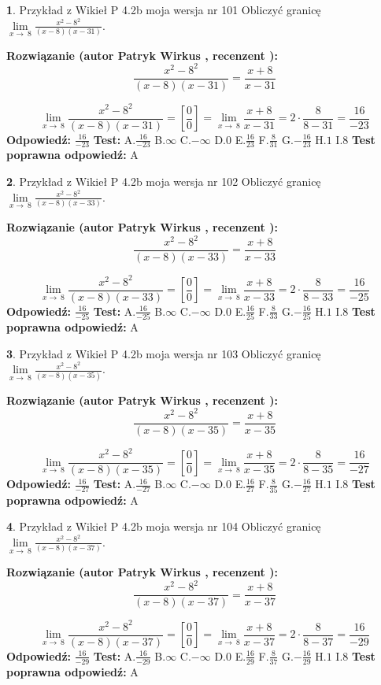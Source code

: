 \documentclass[12pt, a4paper]{article}
\theoremstyle{definition} %
\newtheorem{zad}{}
\newcommand{\zadStart}[1]{\begin{zad}#1\newline}
\newcommand{\zadStop}{\end{zad}}
\newcommand{\rozwStart}[2]{\noindent \textbf{Rozwiązanie (autor #1 , recenzent #2): }\newline}
\newcommand{\rozwStop}{\newline}
\newcommand{\odpStart}{\noindent \textbf{Odpowiedź:}\newline}
\newcommand{\odpStop}{\newline}
\newcommand{\testStart}{\noindent \textbf{Test:}\newline}
\newcommand{\testStop}{\newline}
\newcommand{\kluczStart}{\noindent \textbf{Test poprawna odpowiedź:}\newline}
\newcommand{\kluczStop}{\newline}
\begin{document}
\zadStart{Przykład z Wikieł P 4.2b moja wersja nr 101}
Obliczyć granicę $\lim\limits_{x\to\ 8}\frac{x^{2}-8^{2}}{(x-8)(x-31)}$.
\zadStop
\rozwStart{Patryk Wirkus}{}
$$\frac{x^{2}-8^{2}}{(x-8)(x-31)}=\frac{x+8}{x-31}$$

$$\lim\limits_{x\to\ 8}\frac{x^{2}-8^{2}}{(x-8)(x-31)}=[\frac{0}{0}]=\lim\limits_{x\to\ 8}\frac{x+8}{x-31}=2 \cdot \frac{8}{8-31} = \frac{16}{-23}$$
\rozwStop
\odpStart
$\frac{16}{-23}$
\odpStop
\testStart
A.$\frac{16}{-23}$
B.$\infty$
C.$-\infty$
D.$0$
E.$\frac{16}{23}$
F.$\frac{8}{31}$
G.$-\frac{16}{23}$
H.$1$
I.$8$
\testStop
\kluczStart
A
\kluczStop



\zadStart{Przykład z Wikieł P 4.2b moja wersja nr 102}
Obliczyć granicę $\lim\limits_{x\to\ 8}\frac{x^{2}-8^{2}}{(x-8)(x-33)}$.
\zadStop
\rozwStart{Patryk Wirkus}{}
$$\frac{x^{2}-8^{2}}{(x-8)(x-33)}=\frac{x+8}{x-33}$$

$$\lim\limits_{x\to\ 8}\frac{x^{2}-8^{2}}{(x-8)(x-33)}=[\frac{0}{0}]=\lim\limits_{x\to\ 8}\frac{x+8}{x-33}=2 \cdot \frac{8}{8-33} = \frac{16}{-25}$$
\rozwStop
\odpStart
$\frac{16}{-25}$
\odpStop
\testStart
A.$\frac{16}{-25}$
B.$\infty$
C.$-\infty$
D.$0$
E.$\frac{16}{25}$
F.$\frac{8}{33}$
G.$-\frac{16}{25}$
H.$1$
I.$8$
\testStop
\kluczStart
A
\kluczStop



\zadStart{Przykład z Wikieł P 4.2b moja wersja nr 103}
Obliczyć granicę $\lim\limits_{x\to\ 8}\frac{x^{2}-8^{2}}{(x-8)(x-35)}$.
\zadStop
\rozwStart{Patryk Wirkus}{}
$$\frac{x^{2}-8^{2}}{(x-8)(x-35)}=\frac{x+8}{x-35}$$

$$\lim\limits_{x\to\ 8}\frac{x^{2}-8^{2}}{(x-8)(x-35)}=[\frac{0}{0}]=\lim\limits_{x\to\ 8}\frac{x+8}{x-35}=2 \cdot \frac{8}{8-35} = \frac{16}{-27}$$
\rozwStop
\odpStart
$\frac{16}{-27}$
\odpStop
\testStart
A.$\frac{16}{-27}$
B.$\infty$
C.$-\infty$
D.$0$
E.$\frac{16}{27}$
F.$\frac{8}{35}$
G.$-\frac{16}{27}$
H.$1$
I.$8$
\testStop
\kluczStart
A
\kluczStop



\zadStart{Przykład z Wikieł P 4.2b moja wersja nr 104}
Obliczyć granicę $\lim\limits_{x\to\ 8}\frac{x^{2}-8^{2}}{(x-8)(x-37)}$.
\zadStop
\rozwStart{Patryk Wirkus}{}
$$\frac{x^{2}-8^{2}}{(x-8)(x-37)}=\frac{x+8}{x-37}$$

$$\lim\limits_{x\to\ 8}\frac{x^{2}-8^{2}}{(x-8)(x-37)}=[\frac{0}{0}]=\lim\limits_{x\to\ 8}\frac{x+8}{x-37}=2 \cdot \frac{8}{8-37} = \frac{16}{-29}$$
\rozwStop
\odpStart
$\frac{16}{-29}$
\odpStop
\testStart
A.$\frac{16}{-29}$
B.$\infty$
C.$-\infty$
D.$0$
E.$\frac{16}{29}$
F.$\frac{8}{37}$
G.$-\frac{16}{29}$
H.$1$
I.$8$
\testStop
\kluczStart
A
\kluczStop
\end{document}
